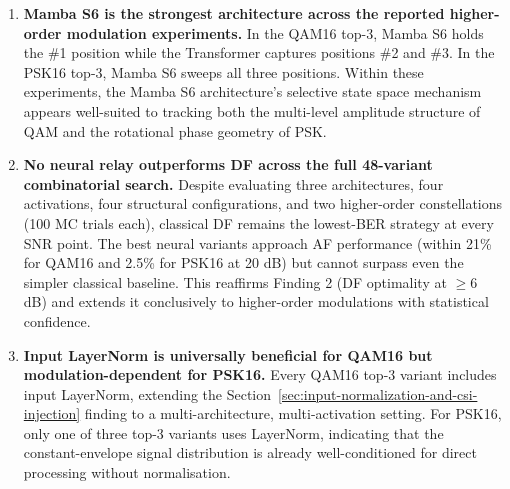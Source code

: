 \begin{enumerate}
\item
  \textbf{Mamba S6 is the strongest architecture across the reported higher-order modulation experiments.} In the QAM16 top-3, Mamba S6 holds the \#1 position while the Transformer captures positions \#2 and \#3. In the PSK16 top-3, Mamba S6 sweeps all three positions. Within these experiments, the Mamba S6 architecture's selective state space mechanism appears well-suited to tracking both the multi-level amplitude structure of QAM and the rotational phase geometry of PSK.
\item
  \textbf{No neural relay outperforms DF across the full 48-variant combinatorial search.} Despite evaluating three architectures, four activations, four structural configurations, and two higher-order constellations (100 MC trials each), classical DF remains the lowest-BER strategy at every SNR point. The best neural variants approach AF performance (within 21\% for QAM16 and 2.5\% for PSK16 at 20 dB) but cannot surpass even the simpler classical baseline. This reaffirms Finding 2 (DF optimality at $\geq$6 dB) and extends it conclusively to higher-order modulations with statistical confidence.
\item
  \textbf{Input LayerNorm is universally beneficial for QAM16 but modulation-dependent for PSK16.} Every QAM16 top-3 variant includes input LayerNorm, extending the Section~\ref{sec:input-normalization-and-csi-injection} finding to a multi-architecture, multi-activation setting. For PSK16, only one of three top-3 variants uses LayerNorm, indicating that the constant-envelope signal distribution is already well-conditioned for direct processing without normalisation.
\end{enumerate}

